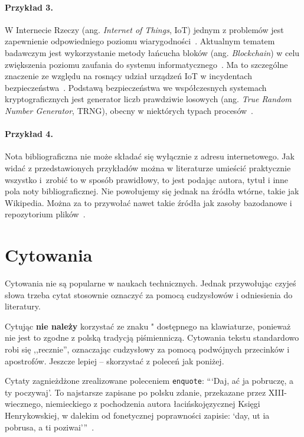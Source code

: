 \paragraph{Przykład 3.} W Internecie Rzeczy (ang. \textit{Internet of Things}, IoT) jednym z problemów jest zapewnienie odpowiedniego poziomu wiarygodności~\cite{truong2018}. Aktualnym tematem badawczym jest wykorzystanie metody łańcucha bloków (ang. \textit{Blockchain}) w celu zwiększenia poziomu zaufania do systemu informatycznego~\cite{poirier2020}. Ma to szczególne znaczenie ze względu na rosnący udział urządzeń IoT w incydentach bezpieczeństwa~\cite{nask2020}. Podstawą bezpieczeństwa we współczesnych systemach kryptograficznych jest generator liczb prawdziwie losowych (ang. \textit{True Random Number Generator}, TRNG), obecny w niektórych typach procesów~\cite{AN4230}.

\paragraph{Przykład 4.} Nota bibliograficzna nie może składać się wyłącznie z adresu internetowego. Jak widać z przedstawionych przykładów można w literaturze umieścić praktycznie wszystko i~zrobić to w sposób prawidłowy, to jest podając autora, tytuł i inne pola noty bibliograficznej. Nie powołujemy się jednak na źródła wtórne, takie jak Wikipedia. Można za to przywołać nawet takie źródła jak zasoby bazodanowe i repozytorium plików~\cite{szablon}.

\section{Cytowania}
Cytowania nie są popularne w naukach technicznych. Jednak przywołując czyjeś słowa trzeba cytat stosownie oznaczyć za pomocą cudzysłowów i odniesienia do literatury.

Cytując \textbf{nie należy} korzystać ze znaku " dostępnego na klawiaturze, ponieważ nie jest to zgodne z polską tradycją piśmienniczą. Cytowania tekstu standardowo robi się ,,recznie'', oznaczając cudzysłowy za pomocą podwójnych przecinków i apostrofów. Jeszcze lepiej -- skorzystać z poleceń jak poniżej.

Cytaty zagnieżdżone zrealizowane poleceniem \texttt{enquote}:
\enquote{\enquote{Daj, ać ja pobruczę, a ty poczywaj}. To najstarsze zapisane po polsku zdanie, przekazane przez XIII-wiecznego, niemieckiego z pochodzenia autora łacińskojęzycznej Księgi Henrykowskiej, w dalekim od fonetycznej poprawności zapisie: \enquote{day, ut ia pobrusa, a ti poziwai}}~\cite{wilamowski2017}.

